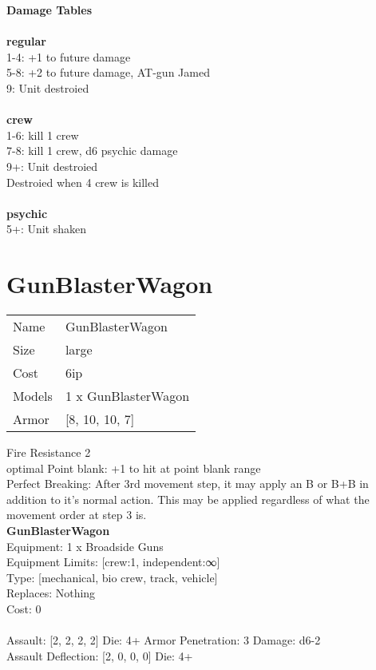 {\bf Damage Tables} \\
\ \\ {\bf regular } \\
1-4: +1 to future damage \\
5-8: +2 to future damage, AT-gun Jamed \\
9: Unit destroied \\
\ \\ {\bf crew } \\
1-6: kill 1 crew \\
7-8: kill 1 crew, d6 psychic damage \\
9+: Unit destroied \\
Destroied when 4 crew is killed \\
\ \\ {\bf psychic } \\
5+: Unit shaken \\










\pagebreak\pagebreak

\section{ GunBlasterWagon }

\begin{tabular}{ll}
  Name & GunBlasterWagon \\
  Size & large\\
  Cost & 6ip\\
  Models & 1 x GunBlasterWagon\\
  Armor & [8, 10, 10, 7]\\
\end{tabular}

\noindent Fire Resistance 2\\ 
optimal Point blank: +1 to hit at point blank range\\ 
Perfect Breaking: After 3rd movement step, it may apply an B or B+B in addition to it's normal action. This may be applied regardless of what the movement order at step 3 is.\\ 


{\bf GunBlasterWagon } \\
Equipment: 1 x Broadside Guns \\
Equipment Limits: [crew:1, independent:∞] \\
Type: [mechanical, bio crew, track, vehicle] \\
Replaces: Nothing \\
Cost: 0\\
\ \\
Assault: [2, 2, 2, 2] Die: 4+ Armor Penetration: 3 Damage: d6-2 \\
Assault Deflection: [2, 0, 0, 0] Die: 4+\\
\indent  
\ \\

